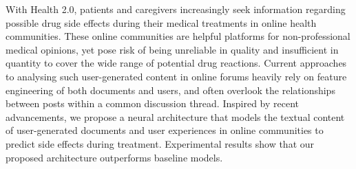 With Health 2.0, patients and caregivers increasingly seek information regarding possible drug side effects during their medical treatments in online health communities.  These online communities are helpful platforms for non-professional medical opinions, yet pose risk of being unreliable in quality and insufficient in quantity to cover the wide range of potential drug reactions. Current approaches to analysing such user-generated content in online forums heavily rely on feature engineering of both documents and users, and often overlook the relationships between posts within a common discussion thread. Inspired by recent advancements, we propose a neural architecture that models the textual content of user-generated documents and user experiences in online communities to predict side effects during treatment. Experimental results show that our proposed architecture outperforms baseline models.
